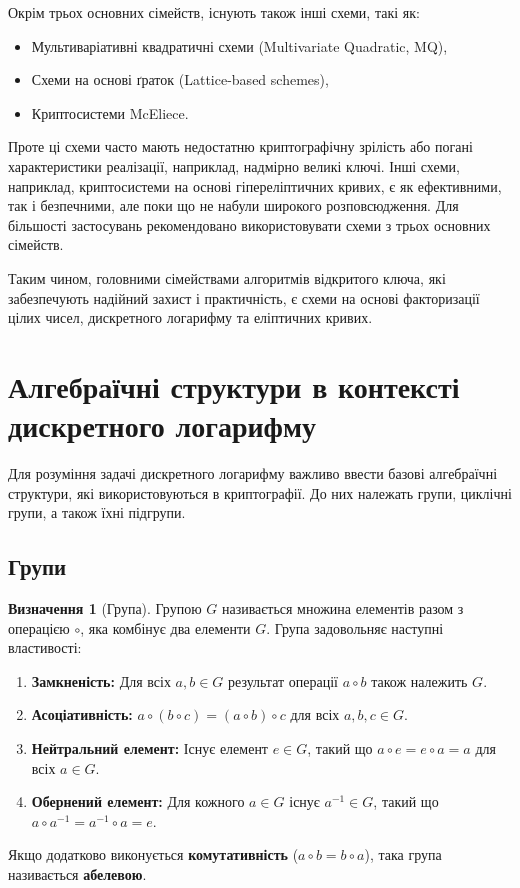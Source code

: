 \documentclass[12pt]{report}
\theoremstyle{definition}
\newtheorem{definition}{Визначення}[chapter]
\theoremstyle{plain}
\begin{document}
Окрім трьох основних сімейств, існують також інші схеми, такі як:
\begin{itemize}
    \item Мультиваріативні квадратичні схеми (Multivariate Quadratic, MQ),
    \item Схеми на основі ґраток (Lattice-based schemes),
    \item Криптосистеми McEliece.
\end{itemize}

Проте ці схеми часто мають недостатню криптографічну зрілість або погані характеристики реалізації, наприклад, надмірно великі ключі. Інші схеми, наприклад, криптосистеми на основі гіпереліптичних кривих, є як ефективними, так і безпечними, але поки що не набули широкого розповсюдження. Для більшості застосувань рекомендовано використовувати схеми з трьох основних сімейств.

Таким чином, головними сімействами алгоритмів відкритого ключа, які забезпечують надійний захист і практичність, є схеми на основі факторизації цілих чисел, дискретного логарифму та еліптичних кривих.

\section{Алгебраїчні структури в контексті дискретного логарифму}

Для розуміння задачі дискретного логарифму важливо ввести базові алгебраїчні структури, які використовуються в криптографії. До них належать групи, циклічні групи, а також їхні підгрупи.

\subsection{Групи}

\begin{definition}[Група]
Групою \( G \) називається множина елементів разом з операцією \( \circ \), яка комбінує два елементи \( G \). Група задовольняє наступні властивості:
\begin{enumerate}
    \item \textbf{Замкненість:} Для всіх \( a, b \in G \) результат операції \( a \circ b \) також належить \( G \).
    \item \textbf{Асоціативність:} \( a \circ (b \circ c) = (a \circ b) \circ c \) для всіх \( a, b, c \in G \).
    \item \textbf{Нейтральний елемент:} Існує елемент \( e \in G \), такий що \( a \circ e = e \circ a = a \) для всіх \( a \in G \).
    \item \textbf{Обернений елемент:} Для кожного \( a \in G \) існує \( a^{-1} \in G \), такий що \( a \circ a^{-1} = a^{-1} \circ a = e \).
\end{enumerate}
Якщо додатково виконується \textbf{комутативність} (\( a \circ b = b \circ a \)), така група називається \textbf{абелевою}.
\end{definition}
\end{document}
